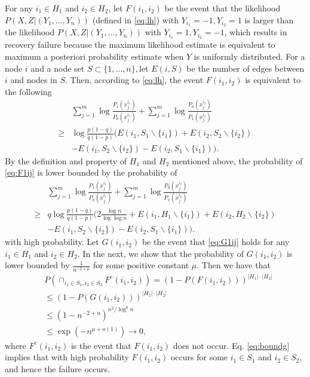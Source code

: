 \documentclass[conference]{IEEEtran}
\begin{document}
		For any $i_1\in H_1$ and $i_2\in H_2$, let $F(i_1,i_2)$ be the event that the likelihood $P(X,Z|(Y_1,\ldots,Y_n))$ (defined in \eqref{eq:lh}) with $Y_{i_1}=-1,Y_{i_2}=1$ is larger than the likelihood $P(X,Z|(Y_1,\ldots,Y_n))$ with $Y_{i_1}=1,Y_{i_2}=-1$, which results in  recovery failure because the maximum likelihood estimate is equivalent to maximum a posteriori probability estimate when $Y$ is uniformly distributed. For a node $i$ and a node set $S\subset\{1,\ldots,n\}, $let $E(i,S)$ be the number of edges between $i$ and nodes in $S$. Then, according to \eqref{eq:lh}, the event $F(i_1,i_2)$ is equivalent to  
		the following 
		\begin{align}
			&\sum_{j=1}^{m} \log \frac{P_1(x^{i_1}_{j})}{P_0(x^{i_1}_{j})}
			+\sum_{j=1}^{m} \log \frac{P_0(x^{i_2}_{j})}{P_1(x^{i_2}_{j})}\nonumber\\
			\ge &\log \frac{p(1-q)}{q(1-p)}(E(i_1, S_1 \backslash \{i_1\}) + E(i_2, S_2 \backslash \{i_2\})\nonumber\\
			&- E(i_1, S_2 \backslash \{i_2\}) - E(i_2, S_1 \backslash \{i_1\})) \label{eq:F1ij}.
		\end{align}
		By the definition and property of $H_1$ and $H_2$ mentioned above, the probability of \eqref{eq:F1ij} is lower bounded by the probability of
		\begin{align}
			&\sum_{j=1}^{m} \log \frac{P_1(x^{i_1}_{j})}{P_0(x^{i_1}_{j})}
			+\sum_{j=1}^{m} \log \frac{P_0(x^{i_2}_{j})}{P_1(x^{i_2}_{j})}\nonumber\\
			\ge &q\log \frac{p(1-q)}{q(1-p)}(2\frac{\log n}{\log\log n}+E(i_1, H_1 \backslash \{i_1\}) + E(i_2, H_2 \backslash \{i_2\})\nonumber\\
			&- E(i_1, S_2 \backslash \{i_2\}) - E(i_2, S_1 \backslash \{i_1\})) \label{eq:G1ij}.
		\end{align}
		with high probability. Let $G(i_1,i_2)$ be the event that \eqref{eq:G1ij} holds for any $i_1\in H_1$ and $i_2\in H_2$. In the next, we show that
		the probability of $G(i_1,i_2)$ is lower bounded by $\frac{1}{n^{-2+\mu}}$ for some positive constant $\mu$. Then we have that 
		\begin{align}
			& P(\cap_{i_1\in S_1, i_2\in S_2} F^c(i_1,i_2)) = (1 - P(F(i_1,i_2)))^{|H_1|\cdot|H_2|} \nonumber\\
			& \le (1 - P(G(i_1,i_2)))^{|H_1|\cdot|H_2|}\nonumber\\
			& \leq (1-n^{-2+u})^{n^2/\log^6 n} \nonumber\\
			& \leq \exp(-n^{\mu+ o(1)}) \to 0, \label{eq:boundg}
		\end{align}
		where $F^c(i_1,i_2)$ is the event that $F(i_1,i_2)$ does not occur. Eq. \eqref{eq:boundg} implies that with high probability $F(i_1,i_2)$ occurs for some $i_1\in S_1$ and $i_2\in S_2$, and hence the failure occurs.
		
\end{document}
